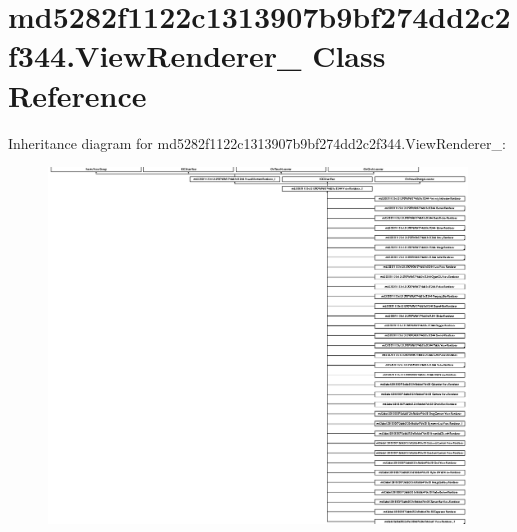 \hypertarget{classmd5282f1122c1313907b9bf274dd2c2f344_1_1ViewRenderer__2}{}\section{md5282f1122c1313907b9bf274dd2c2f344.\+View\+Renderer\+\_ Class Reference}
\label{classmd5282f1122c1313907b9bf274dd2c2f344_1_1ViewRenderer__2}
Inheritance diagram for md5282f1122c1313907b9bf274dd2c2f344.\+View\+Renderer\+\_\+:\begin{figure}[H]
\begin{center}
\leavevmode
\includegraphics[height=9.439636cm]{classmd5282f1122c1313907b9bf274dd2c2f344_1_1ViewRenderer__2}
\end{center}
\end{figure}
